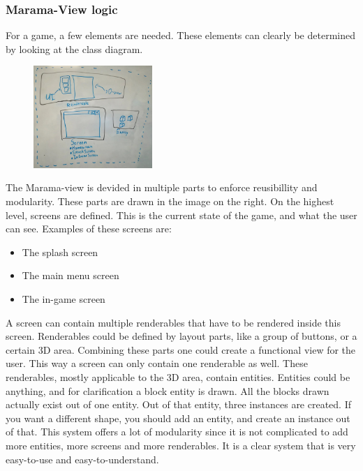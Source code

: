 \documentclass[10pt]{extarticle} %
\begin{document}
    \subsubsection[MaramaViewLogic]{Marama-View logic}
    For a game, a few elements are needed. These elements can clearly be determined by looking at the class diagram. \\
    \begin{figure}
        \centering
        \includegraphics[width=0.4\textwidth, keepaspectratio]{marama-view-structure.jpg}
    \end{figure}
    The Marama-view is devided in multiple parts to enforce reusibillity and modularity.
    These parts are drawn in the image on the right.
    On the highest level, screens are defined.
    This is the current state of the game, and what the user can see.
    Examples of these screens are:
    \begin{itemize}
        \item The splash screen
        \item The main menu screen
        \item The in-game screen
    \end{itemize}
    A screen can contain multiple renderables that have to be rendered inside this screen.
    Renderables could be defined by layout parts, like a group of buttons, or a certain 3D area.
    Combining these parts one could create a functional view for the user.
    This way a screen can only contain one renderable as well.
    These renderables, mostly applicable to the 3D area, contain entities.
    Entities could be anything, and for clarification a block entity is drawn.
    All the blocks drawn actually exist out of one entity.
    Out of that entity, three instances are created.
    If you want a different shape, you should add an entity, and create an instance out of that.
    This system offers a lot of modularity since it is not complicated to add more entities, more screens and more renderables.
    It is a clear system that is very easy-to-use and easy-to-understand.
    \newpage
\end{document}
